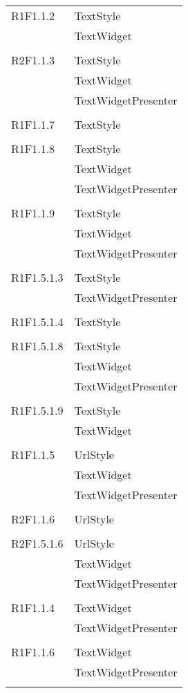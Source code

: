 \begin{center}
\begin{longtable}{|p{7cm}|p{5cm}|}
		R1F1.1.2 & TextStyle \\ & TextWidget \\ & \\ \hline
		R2F1.1.3 & TextStyle \\ & TextWidget \\ & TextWidgetPresenter \\ & \\ \hline
		R1F1.1.7 & TextStyle \\ & \\ \hline
		R1F1.1.8 & TextStyle \\ & TextWidget \\ & TextWidgetPresenter \\ & \\ \hline
		R1F1.1.9 & TextStyle \\ & TextWidget \\ & TextWidgetPresenter \\ & \\ \hline
		R1F1.5.1.3 & TextStyle \\ & TextWidgetPresenter \\ & \\ \hline
		R1F1.5.1.4 & TextStyle \\ & \\ \hline
		R1F1.5.1.8 & TextStyle \\ & TextWidget \\ & TextWidgetPresenter \\ & \\ \hline
		R1F1.5.1.9 & TextStyle \\ & TextWidget \\ & \\ \hline
		R1F1.1.5 & UrlStyle \\ & TextWidget \\ & TextWidgetPresenter \\ & \\ \hline
		R2F1.1.6 & UrlStyle \\ & \\ \hline
		R2F1.5.1.6 & UrlStyle \\ & TextWidget \\ & TextWidgetPresenter \\ & \\ \hline
		R1F1.1.4 & TextWidget \\ & TextWidgetPresenter \\ & \\ \hline
		R1F1.1.6 & TextWidget \\ & TextWidgetPresenter \\ & \\ \hline

\end{longtable}
\end{center}
